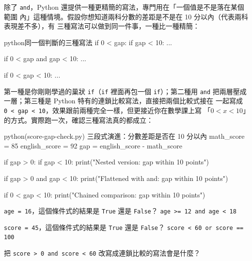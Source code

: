 除了 \texttt{and}，Python 還提供一種更精簡的寫法，專門用在「一個值是不是落在某個範圍
內」這種情境。假設你想知道兩科分數的差距是不是在 10 分以內（代表兩科表現差不多），有
三種寫法可以做到同一件事，一種比一種精簡：

\begin{code}{python}{同一個判斷的三種寫法}
if 0 < gap:
    if gap < 10:
        ...

if 0 < gap and gap < 10:
    ...

if 0 < gap < 10:
    ...
\end{code}

第一種是你剛剛學過的巢狀 \texttt{if}（\texttt{if} 裡面再包一個 \texttt{if}）；第二種用
\texttt{and} 把兩層壓成一層；第三種是 Python 特有的連鎖比較寫法，直接把兩個比較式接在
一起寫成 \texttt{0 < gap < 10}，效果跟前兩種完全一樣，但更接近你在數學課上寫
「$0 < x < 10$」的方式。實際跑一次，確認三種寫法真的都成立：

\begin{example}{python}{(score-gap-check.py) 三段式演進：分數差距是否在 10 分以內}
math_score = 85
english_score = 92
gap = english_score - math_score

if gap > 0:
    if gap < 10:
        print("Nested version: gap within 10 points")

if gap > 0 and gap < 10:
    print("Flattened with and: gap within 10 points")

if 0 < gap < 10:
    print("Chained comparison: gap within 10 points")
\end{example}



\begin{drills}[label=drills:logical-operators]
\item \texttt{age = 16}，這個條件式的結果是 \texttt{True} 還是 \texttt{False}？
\texttt{age >= 12 and age < 18}
\item \texttt{score = 45}，這個條件式的結果是 \texttt{True} 還是 \texttt{False}？
\texttt{score < 60 or score == 100}
\item 把 \texttt{score > 0 and score < 60} 改寫成連鎖比較的寫法會是什麼？
\end{drills}

